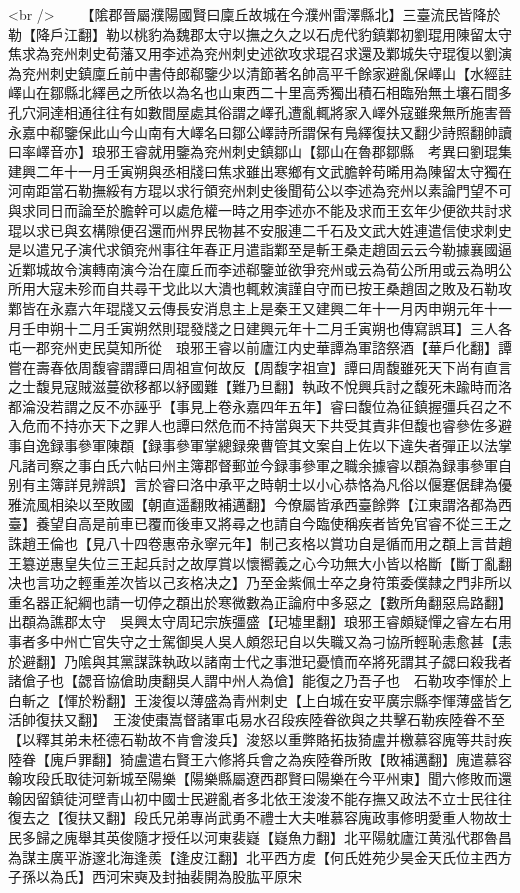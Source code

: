 <br />
　　【隂郡晉屬濮陽國賢曰廩丘故城在今濮州雷澤縣北】三臺流民皆降於勒【降戶江翻】勒以桃豹為魏郡太守以撫之久之以石虎代豹鎮鄴初劉琨用陳留太守焦求為兖州刺史荀藩又用李述為兖州刺史述欲攻求琨召求還及鄴城失守琨復以劉演為兖州刺史鎮廩丘前中書侍郎郗鑒少以清節著名帥高平千餘家避亂保嶧山【水經註嶧山在鄒縣北繹邑之所依以為名也山東西二十里高秀獨出積石相臨殆無土壤石間多孔穴洞達相通往往有如數間屋處其俗謂之嶧孔遭亂輒將家入嶧外寇雖衆無所施害晉永嘉中郗鑒保此山今山南有大嶧名曰鄒公嶧詩所謂保有鳬繹復扶又翻少詩照翻帥讀曰率嶧音亦】琅邪王睿就用鑒為兖州刺史鎮鄒山【鄒山在魯郡鄒縣　考異曰劉琨集建興二年十一月壬寅朔與丞相牋曰焦求雖出寒鄉有文武膽幹苟晞用為陳留太守獨在河南距當石勒撫綏有方琨以求行領兖州刺史後聞荀公以李述為兖州以素論門望不可與求同日而論至於膽幹可以處危權一時之用李述亦不能及求而王玄年少便欲共討求琨以求已與玄構隙便召還而州界民物甚不安服連二千石及文武大姓連遣信使求刺史是以遣兄子演代求領兖州事往年春正月遣詣鄴至是斬王桑走趙固云云今勒據襄國逼近鄴城故令演轉南演今治在廩丘而李述郗鑒並欲爭兖州或云為荀公所用或云為明公所用大寇未殄而自共尋干戈此以大潰也輒敕演謹自守而已按王桑趙固之敗及石勒攻鄴皆在永嘉六年琨牋又云傳長安消息主上是秦王又建興二年十一月丙申朔元年十一月壬申朔十二月壬寅朔然則琨發牋之日建興元年十二月壬寅朔也傳寫誤耳】三人各屯一郡兖州吏民莫知所從　琅邪王睿以前廬江内史華譚為軍諮祭酒【華戶化翻】譚嘗在壽春依周馥睿謂譚曰周祖宣何故反【周馥字祖宣】譚曰周馥雖死天下尚有直言之士馥見寇賊滋蔓欲移都以紓國難【難乃旦翻】執政不悅興兵討之馥死未踰時而洛都淪没若謂之反不亦誣乎【事見上卷永嘉四年五年】睿曰馥位為征鎮握彊兵召之不入危而不持亦天下之罪人也譚曰然危而不持當與天下共受其責非但馥也睿參佐多避事自逸録事參軍陳頵【録事參軍掌總録衆曹管其文案自上佐以下違失者彈正以法掌凡諸司察之事白氏六帖曰州主簿郡督郵並今録事參軍之職余據睿以頵為録事參軍自别有主簿詳見辨誤】言於睿曰洛中承平之時朝士以小心恭恪為凡俗以偃蹇倨肆為優雅流風相染以至敗國【朝直遥翻敗補邁翻】今僚屬皆承西臺餘弊【江東謂洛都為西臺】養望自高是前車已覆而後車又將尋之也請自今臨使稱疾者皆免官睿不從三王之誅趙王倫也【見八十四卷惠帝永寧元年】制己亥格以賞功自是循而用之頵上言昔趙王簒逆惠皇失位三王起兵討之故厚賞以懷嚮義之心今功無大小皆以格斷【斷丁亂翻决也言功之輕重差次皆以己亥格决之】乃至金紫佩士卒之身符策委僕隸之門非所以重名器正紀綱也請一切停之頵出於寒微數為正論府中多惡之【數所角翻惡烏路翻】出頵為譙郡太守　吳興太守周玘宗族彊盛【玘墟里翻】琅邪王睿頗疑憚之睿左右用事者多中州亡官失守之士駕御吳人吳人頗怨玘自以失職又為刁協所輕恥恚愈甚【恚於避翻】乃隂與其黨謀誅執政以諸南士代之事泄玘憂憤而卒將死謂其子勰曰殺我者諸傖子也【勰音協傖助庚翻吳人謂中州人為傖】能復之乃吾子也　石勒攻李惲於上白斬之【惲於粉翻】王浚復以薄盛為青州刺史【上白城在安平廣宗縣李惲薄盛皆乞活帥復扶又翻】　王浚使棗嵩督諸軍屯易水召段疾陸眷欲與之共擊石勒疾陸眷不至【以釋其弟未柸德石勒故不肯會浚兵】浚怒以重弊賂拓抜猗盧并檄慕容廆等共討疾陸眷【廆戶罪翻】猗盧遣右賢王六修將兵會之為疾陸眷所敗【敗補邁翻】廆遣慕容翰攻段氏取徒河新城至陽樂【陽樂縣屬遼西郡賢曰陽樂在今平州東】聞六修敗而還翰因留鎮徒河壁青山初中國士民避亂者多北依王浚浚不能存撫又政法不立士民往往復去之【復扶又翻】段氏兄弟專尚武勇不禮士大夫唯慕容廆政事修明愛重人物故士民多歸之廆舉其英俊隨才授任以河東裴嶷【嶷魚力翻】北平陽躭廬江黄泓代郡魯昌為謀主廣平游邃北海逢羨【逢皮江翻】北平西方䖍【何氏姓苑少昊金天氏位主西方子孫以為氏】西河宋奭及封抽裴開為股肱平原宋